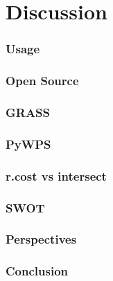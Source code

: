 
\chapter{Discussion} %

\label{ch:introduction} %


\subsection{Usage}


\subsection{Open Source}


\subsection{GRASS}


\subsection{PyWPS}


\subsection{r.cost vs intersect}


\subsection{SWOT}

\subsection{Perspectives}


\subsection{Conclusion}